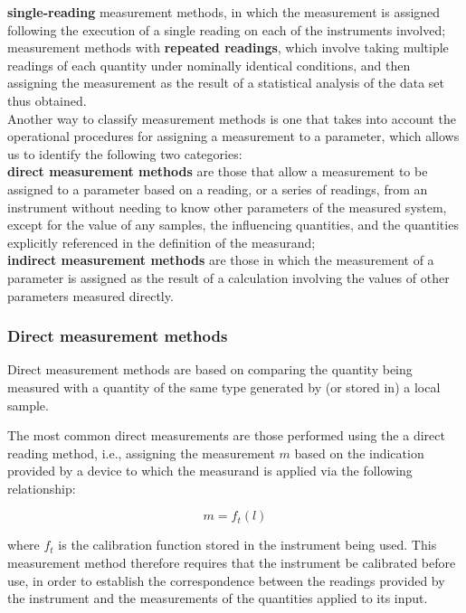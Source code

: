 \documentclass[../main.tex]{subfiles}
\begin{document}
\textbf{single-reading} measurement methods, in which the measurement is assigned following the execution of a single reading on each of the instruments involved;\\

measurement methods with \textbf{repeated readings}, which involve taking multiple readings of each quantity under nominally identical conditions, and then assigning the measurement as the result of a statistical analysis of the data set thus obtained.\\

Another way to classify measurement methods is one that takes into account the operational procedures for assigning a measurement to a parameter, which allows us to identify the following two categories:\\

\textbf{direct measurement methods} are those that allow a measurement to be assigned to a parameter based on  a reading, or a series of readings, from an instrument without needing to know other parameters of the measured system, except for the value of any samples, the influencing quantities, and the quantities explicitly referenced in the definition of the measurand; \\

\textbf{indirect measurement methods} are those in which the measurement of a parameter is assigned as the result of a calculation involving the values of other parameters measured directly.

\subsubsection{Direct measurement methods}

Direct measurement methods are based on comparing the quantity being measured with a quantity of the same type generated by (or stored in) a local sample.

The most common direct measurements are those performed using the a direct reading method, i.e., assigning the measurement $m$ based on the indication provided by a device to which the measurand is applied via the following relationship:


\begin{equation}
	m = f_t(l)
\end{equation}

where $f_t$ is the calibration function stored in the instrument being used.
This measurement method therefore requires that the instrument be calibrated before use, in order to establish the correspondence between the readings provided by the instrument and the measurements of the quantities applied to its input.
\end{document}
